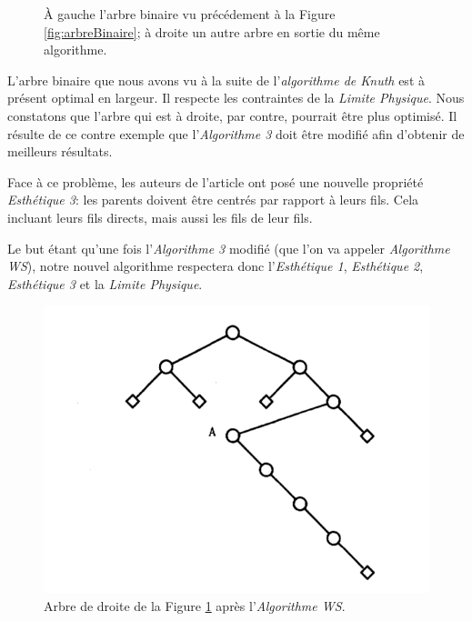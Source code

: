 \documentclass{article}
\begin{document}
\begin{figure}[h]
\begin{center}
\begin{right}
          \end{right}
        \end{center}
    	\caption{À gauche l'arbre binaire vu précédement à la Figure \ref{fig:arbreBinaire}; à droite un autre arbre en sortie du même algorithme.  \cite{article79}}
      \label{fig:arbresAlgo3}
    \end{figure}
    \vfill


    L'arbre binaire que nous avons vu à la suite de l'\emph{algorithme de Knuth} est à présent optimal en largeur. Il respecte les contraintes de la \emph{Limite Physique}. Nous constatons que l'arbre qui est à droite, par contre, pourrait être plus optimisé. Il résulte de ce contre exemple que l'\emph{Algorithme 3} doit être modifié afin d'obtenir de meilleurs résultats.

    Face à ce problème, les auteurs de l'article \cite{article79} ont posé une nouvelle propriété \emph{Esthétique 3}: les parents doivent être centrés par rapport à leurs fils. Cela incluant leurs fils directs, mais aussi les fils de leur fils.

    Le but étant qu'une fois l'\emph{Algorithme 3} modifié (que l'on va appeler \emph{Algorithme WS}), notre nouvel algorithme respectera donc l'\emph{Esthétique 1}, \emph{Esthétique 2}, \emph{Esthétique 3} et la \emph{Limite Physique}.

    \vfill
    \begin{figure}[h]
        \begin{center}
      		\includegraphics[scale=0.5]{arbreWS.png}
        \end{center}
    	\caption{Arbre de droite de la Figure \ref{fig:arbresAlgo3} après l'\emph{Algorithme WS}. \cite{article79}}
      \label{fig:arbresAlgoWS}
    \end{figure}
    \vfill
\end{document}
